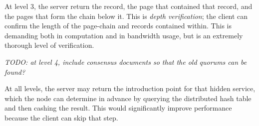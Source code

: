 At level 3, the server return the record, the page that contained that record, and the pages that form the chain below it. This is \emph{depth verification}; the client can confirm the length of the page-chain and records contained within. This is demanding both in computation and in bandwidth usage, but is an extremely thorough level of verification. 

\emph{TODO: at level 4, include consensus documents so that the old quorums can be found?}

At all levels, the server may return the introduction point for that hidden service, which the node can determine in advance by querying the distributed hash table and then cashing the result. This would significantly improve performance because the client can skip that step.




